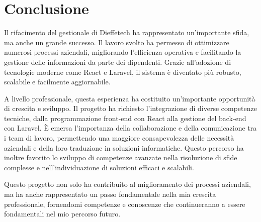 \chapter{Conclusione}\label{chapter:conclusione}

Il rifacimento del gestionale di Dieffetech ha rappresentato un'importante sfida, ma anche un grande successo. Il lavoro svolto ha permesso di ottimizzare numerosi processi aziendali, migliorando l'efficienza operativa e facilitando la gestione delle informazioni da parte dei dipendenti. Grazie all'adozione di tecnologie moderne come React e Laravel, il sistema è diventato più robusto, scalabile e facilmente aggiornabile.

A livello professionale, questa esperienza ha costituito un’importante opportunità di crescita e sviluppo. Il progetto ha richiesto l'integrazione di diverse competenze tecniche, dalla programmazione front-end con React alla gestione del back-end con Laravel. È emersa l'importanza della collaborazione e della comunicazione tra i team di lavoro, permettendo una maggiore consapevolezza delle necessità aziendali e della loro traduzione in soluzioni informatiche. Questo percorso ha inoltre favorito lo sviluppo di competenze avanzate nella risoluzione di sfide complesse e nell'individuazione di soluzioni efficaci e scalabili.

Questo progetto non solo ha contribuito al miglioramento dei processi aziendali, ma ha anche rappresentato un passo fondamentale nella mia crescita professionale, fornendomi competenze e conoscenze che continueranno a essere fondamentali nel mio percorso futuro.
